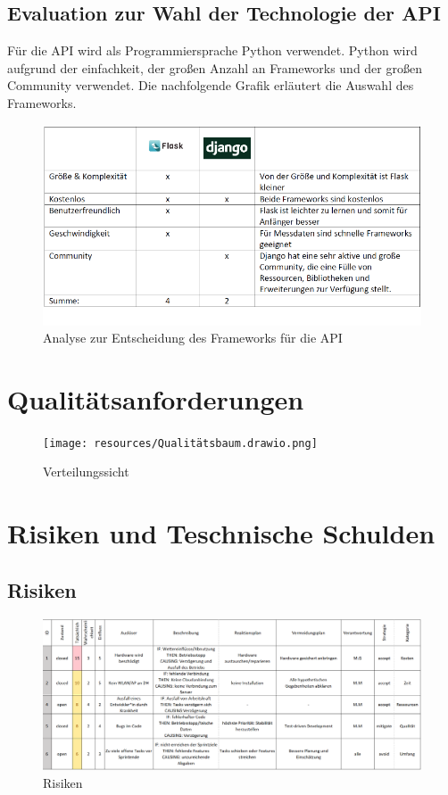 \documentclass[
]{article}
\begin{document}
\subsection{Evaluation zur Wahl der Technologie der API}
Für die API wird als Programmiersprache Python verwendet. Python wird aufgrund der einfachkeit, der großen Anzahl an Frameworks und der großen Community verwendet. Die nachfolgende Grafik erläutert die Auswahl des Frameworks.
\begin{figure}[H]
    \centering
    \includegraphics[width=1\textwidth]{./resources/ArchitekturAPI.png}
    \caption{Analyse zur Entscheidung des Frameworks für die API}
    \label{fig:deine_label}
\end{figure}

\section{Qualitätsanforderungen}
\begin{figure}[H]
	\centering
	\texttt{[image: resources/Qualitätsbaum.drawio.png]}
	\caption{Verteilungssicht}
	\label{fig:Verteilungssicht}
\end{figure}  

\section{Risiken und Teschnische Schulden}
\subsection{Risiken}
\begin{figure}[H]
	\centering
	\includegraphics[width=160mm]{resources/Risiken.png}
	\caption{Risiken}
	\label{fig:Risiken}
\end{figure}
\end{document}
